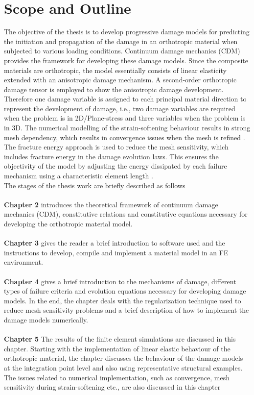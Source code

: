 \documentclass[12pt,a4paper,twoside,openright]{report}
\begin{document}
\section{Scope and Outline}
\indent\indent\indent  The objective of the thesis is to develop progressive damage models for predicting the initiation and propagation of the damage in an orthotropic material when subjected to various loading conditions. Continuum damage mechanics (CDM) provides the framework for developing these damage models. Since the composite materials are orthotropic, the model essentially consists of linear elasticity extended with an anisotropic damage mechanism. A second-order orthotropic damage tensor is employed to show the anisotropic damage development. Therefore one damage variable is assigned to each principal material direction to represent the development of damage, i.e., two damage variables are required when the problem is in 2D/Plane-stress and three variables when the problem is in 3D. The numerical modelling of the strain-softening behaviour results in strong mesh dependency, which results in convergence issues when the mesh is refined \citep{wang2009three}. The fracture energy approach is used to reduce the mesh sensitivity, which includes fracture energy in the damage evolution laws. This ensures the objectivity of the model by adjusting the energy dissipated by each failure mechanism using a characteristic element length
 \citep{falzon2011numerical}.\\
The stages of the thesis work are briefly described as follows\\\\
\textbf{Chapter 2} introduces the theoretical framework of continuum damage mechanics (CDM), constitutive relations and constitutive equations necessary for developing the orthotropic material model. \\\\
\textbf{Chapter 3} gives the reader a brief introduction to software used and the instructions to develop, compile and implement a material model in an FE environment. \\\\
\textbf{Chapter 4} gives a brief introduction to the mechanisms of damage, different types of failure criteria and evolution equations necessary for developing damage models. In the end, the chapter deals with the regularization technique used to reduce mesh sensitivity problems and a brief description of how to implement the damage models numerically. \\\\
\textbf{Chapter 5} The results of the finite element simulations are discussed in this chapter. Starting with the implementation of linear elastic behaviour of the orthotropic material, the chapter discusses the behaviour of the damage models at the integration point level and also using representative structural examples. The issues related to numerical implementation, such as convergence, mesh sensitivity
during strain-softening etc., are also discussed in this chapter
\end{document}
